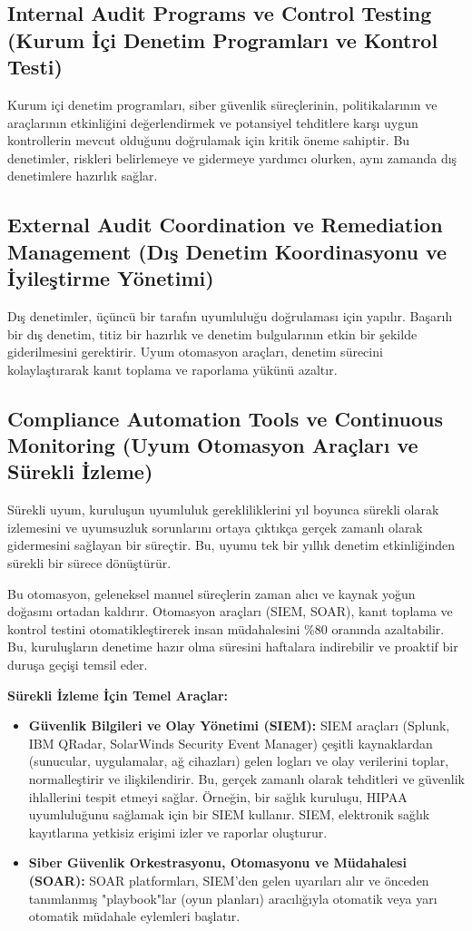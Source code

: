 \subsection{Internal Audit Programs ve Control Testing (Kurum İçi Denetim Programları ve Kontrol Testi)}

Kurum içi denetim programları, siber güvenlik süreçlerinin, politikalarının ve araçlarının etkinliğini değerlendirmek ve potansiyel tehditlere karşı uygun kontrollerin mevcut olduğunu doğrulamak için kritik öneme sahiptir. Bu denetimler, riskleri belirlemeye ve gidermeye yardımcı olurken, aynı zamanda dış denetimlere hazırlık sağlar.

\subsection{External Audit Coordination ve Remediation Management (Dış Denetim Koordinasyonu ve İyileştirme Yönetimi)}

Dış denetimler, üçüncü bir tarafın uyumluluğu doğrulaması için yapılır. Başarılı bir dış denetim, titiz bir hazırlık ve denetim bulgularının etkin bir şekilde giderilmesini gerektirir. Uyum otomasyon araçları, denetim sürecini kolaylaştırarak kanıt toplama ve raporlama yükünü azaltır.

\subsection{Compliance Automation Tools ve Continuous Monitoring (Uyum Otomasyon Araçları ve Sürekli İzleme)}

Sürekli uyum, kuruluşun uyumluluk gerekliliklerini yıl boyunca sürekli olarak izlemesini ve uyumsuzluk sorunlarını ortaya çıktıkça gerçek zamanlı olarak gidermesini sağlayan bir süreçtir. Bu, uyumu tek bir yıllık denetim etkinliğinden sürekli bir sürece dönüştürür.

Bu otomasyon, geleneksel manuel süreçlerin zaman alıcı ve kaynak yoğun doğasını ortadan kaldırır. Otomasyon araçları (SIEM, SOAR), kanıt toplama ve kontrol testini otomatikleştirerek insan müdahalesini \%80 oranında azaltabilir. Bu, kuruluşların denetime hazır olma süresini haftalara indirebilir ve proaktif bir duruşa geçişi temsil eder.

\textbf{Sürekli İzleme İçin Temel Araçlar:}
\begin{itemize}
    \item \textbf{Güvenlik Bilgileri ve Olay Yönetimi (SIEM):} SIEM araçları (Splunk, IBM QRadar, SolarWinds Security Event Manager) çeşitli kaynaklardan (sunucular, uygulamalar, ağ cihazları) gelen logları ve olay verilerini toplar, normalleştirir ve ilişkilendirir. Bu, gerçek zamanlı olarak tehditleri ve güvenlik ihlallerini tespit etmeyi sağlar. Örneğin, bir sağlık kuruluşu, HIPAA uyumluluğunu sağlamak için bir SIEM kullanır. SIEM, elektronik sağlık kayıtlarına yetkisiz erişimi izler ve raporlar oluşturur.
    \item \textbf{Siber Güvenlik Orkestrasyonu, Otomasyonu ve Müdahalesi (SOAR):} SOAR platformları, SIEM'den gelen uyarıları alır ve önceden tanımlanmış "playbook"lar (oyun planları) aracılığıyla otomatik veya yarı otomatik müdahale eylemleri başlatır.
\end{itemize}

